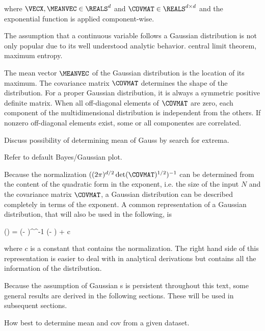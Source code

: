     where $\VECX, \MEANVEC \in \REALS^d$ and $\COVMAT \in \REALS^{d
    \times d}$ and the exponential function is applied component-wise.

    The assumption that a continuous variable follows a Gaussian distribution
    is not only popular due to its well understood analytic behavior. central
    limit theorem, maximum entropy.

    The mean vector $\MEANVEC$ of the Gaussian distribution is the
    location of its maximum. The covariance matrix $\COVMAT$ determines
    the shape of the distribution. For a proper Gaussian distribution, it is
    always a symmetric positive definite matrix. When all off-diagonal elements
    of $\COVMAT$ are zero, each component of the multidimensional
    distribution is independent from the others. If nonzero off-diagonal
    elements exist, some or all componentes are correlated.

    Discuss possibility of determining mean of Gauss by search for extrema.

    Refer to default Bayes/Gaussian plot.

    Because the normalization $((2 \pi)^{d/2} \det(\COVMAT)^{1/2})^{-1}$ can
    be determined from the content of the quadratic form in the exponent,
    i.e. the size of the input $N$ and the covariance matrix $\COVMAT$, a
    Gaussian distribution can be described completely in terms of the exponent.
    A common representation of a Gaussian distribution, that will also be used
    in the following, is

     \ln(\GAUSS{\VECX}{\MEANVEC}{\COVMAT})
        = (\VECX - \MEANVEC)^\top \COVMAT^{-1} (\VECX - \MEANVEC) + c \EQCOMMA
    \stopformula

    where $c$ is a constant that contains the normalization. The right hand
    side of this representation is easier to deal with in analytical
    derivations but contains all the information of the distribution.

    Because the assumption of Gaussian {\PDF}s is persistent throughout this
    text, some general results are derived in the following sections. These
    will be used in subsequent sections.

    \startsubsection[title=Maximum Likelihood Estimators for the Parameters]
        
        How best to determine mean and cov from a given dataset.

    \stopsubsection

    \startsubsection[title={Bayes' Theorem for Gaussians},reference=ch:bayes_gauss]

